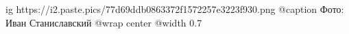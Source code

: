  
 
 
 
 

\ifcmt
  ig https://i2.paste.pics/77d69ddb0863372f1572257e3223f930.png
	@caption Фото: Иван Станиславский
  @wrap center
  @width 0.7
\fi
